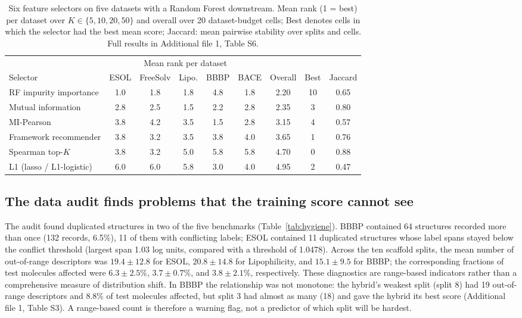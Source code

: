 \begin{table}[t]
\caption{Six feature selectors on five datasets with a Random Forest downstream. Mean rank (1 = best) per dataset over $K\in\{5,10,20,50\}$ and overall over 20 dataset-budget cells; Best denotes cells in which the selector had the best mean score; Jaccard: mean pairwise stability over splits and cells. Full results in Additional file 1, Table S6.}
\label{tab:selectors}
\centering
\footnotesize
\setlength{\tabcolsep}{4pt}
\begin{tabular}{@{}lcccccccc@{}}
\toprule
 & \multicolumn{5}{c}{Mean rank per dataset} & & & \\
\cmidrule(lr){2-6}
Selector & ESOL & FreeSolv & Lipo. & BBBP & BACE & Overall & Best & Jaccard \\
\midrule
RF impurity importance & 1.0 & 1.8 & 1.8 & 4.8 & 1.8 & 2.20 & 10 & 0.65 \\
Mutual information & 2.8 & 2.5 & 1.5 & 2.2 & 2.8 & 2.35 & 3 & 0.80 \\
MI-Pearson & 3.8 & 4.2 & 3.5 & 1.5 & 2.8 & 3.15 & 4 & 0.57 \\
Framework recommender & 3.8 & 3.2 & 3.5 & 3.8 & 4.0 & 3.65 & 1 & 0.76 \\
Spearman top-$K$ & 3.8 & 3.2 & 5.0 & 5.8 & 5.8 & 4.70 & 0 & 0.88 \\
L1 (lasso / L1-logistic) & 6.0 & 6.0 & 5.8 & 3.0 & 4.0 & 4.95 & 2 & 0.47 \\
\bottomrule
\end{tabular}
\end{table}

\subsection{The data audit finds problems that the training score cannot see}\label{subsec:audit-results}

The audit found duplicated structures in two of the five benchmarks (Table~\ref{tab:hygiene}). BBBP contained 64 structures recorded more than once (132 records, 6.5\%), 11 of them with conflicting labels; ESOL contained 11 duplicated structures whose label spans stayed below the conflict threshold (largest span 1.03 log units, compared with a threshold of 1.0478). Across the ten scaffold splits, the mean number of out-of-range descriptors was $19.4\pm12.8$ for ESOL, $20.8\pm14.8$ for Lipophilicity, and $15.1\pm9.5$ for BBBP; the corresponding fractions of test molecules affected were $6.3\pm2.5\%$, $3.7\pm0.7\%$, and $3.8\pm2.1\%$, respectively. These diagnostics are range-based indicators rather than a comprehensive measure of distribution shift. In BBBP the relationship was not monotone: the hybrid's weakest split (split 8) had 19 out-of-range descriptors and 8.8\% of test molecules affected, but split 3 had almost as many (18) and gave the hybrid its best score (Additional file 1, Table S3). A range-based count is therefore a warning flag, not a predictor of which split will be hardest.

